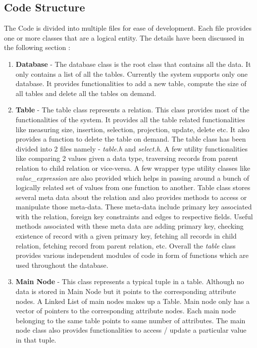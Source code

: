 \documentclass[12pt, oneside]{book}
\begin{document}
\subsection{Code Structure}
The Code is divided into multiple files for ease of development. Each file provides one or more classes that are a logical entity. The details have been discussed in the following section :
\begin{enumerate}
 \item \textbf{Database} - The database class is the root class that contains all the data. It only contains a list of all the tables. Currently the system supports only one database. It provides functionalities to add a new table, compute the size of all tables and delete all the tables on demand.
 \item \textbf{Table} - The table class represents a relation. This class provides most of the functionalities of the system. It provides all the table related functionalities like measuring size, insertion, selection, projection, update, delete etc. It also provides a function to delete the table on demand. The table class has been divided into 2 files namely - \emph{table.h} and \emph{select.h}. A few utility functionalities like comparing 2 values given a data type, traversing records from parent relation to child relation or vice-versa. A few wrapper type utility classes like \emph{value\_expression} are also provided which helps in passing around a bunch of logically related set of values from one function to another. Table class stores several meta data about the relation and also provides methods to access or manipulate those meta-data. These meta-data include primary key associated with the relation, foreign key constraints and edges to respective fields. Useful methods associated with these meta data are adding primary key, checking existence of record with a given primary key, fetching all records in child relation, fetching record from parent relation, etc. Overall the \emph{table} class provides various independent modules of code in form of functions which are used throughout the database.
 \item \textbf{Main Node} - This class represents a typical tuple in a table. Although no data is stored in Main Node but it points to the corresponding attribute nodes. A Linked List of main nodes makes up a Table. Main node only has a vector of pointers to the corresponding attribute nodes. Each main node belonging to the same table points to same number of attributes. The main node class also provides functionalities to access / update a particular value in that tuple.

\end{enumerate}
\end{document}
